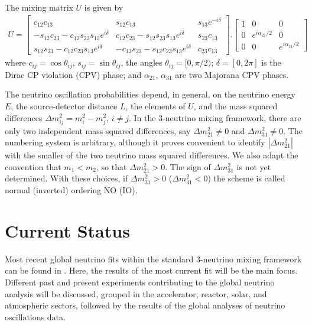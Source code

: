 \documentclass[english]{article}
\begin{document}
    The mixing matrix $U$ is given by
    \begin{gather}
    	U =
        	\begin{bmatrix}
            	c_{12}c_{13} & s_{12}c_{13} & s_{13}e^{-i\delta}\\
                -s_{12}c_{23}-c_{12}s_{23}s_{13}e^{i\delta} & c_{12}c_{23}-s_{12}s_{23}s_{13}e^{i\delta} & s_{23}c_{13}\\
                s_{12}s_{23}-c_{12}c_{23}s_{13}e^{i\delta} & -c_{12}s_{23}-s_{12}c_{23}s_{13}e^{i\delta} & c_{23}c_{13}
            \end{bmatrix} .
            \begin{bmatrix}
            	1 & 0 & 0\\
                0 & e^{i\alpha_{21}/2} & 0\\
                0 & 0 & e^{i\alpha_{31}/2}
            \end{bmatrix}
    \end{gather}
    where $c_{ij}=\cos\theta_{ij}$, $s_{ij}=\sin\theta_{ij}$, the angles $\theta_{ij}=[0,\pi/2)$; $\delta=[0,2\pi]$ is the Dirac CP violation (CPV) phase; and $\alpha_{21}$, $\alpha_{31}$ are two Majorana CPV phases.
    
    The neutrino oscillation probabilities depend, in general, on the neutrino
energy $E$, the source-detector distance $L$, the elements of $U$, and the mass squared differences $\Delta{m_{ij}^{2}}=m_i^{2}-m_j^{2}$, $i \neq j$. In the 3-neutrino mixing framework, there are only two independent mass squared differences, say $\Delta{m_{21}^{2}} \neq 0$ and $\Delta{m_{31}^{2}} \neq 0$. The numbering system is arbitrary, although it proves convenient to identify $|\Delta{m_{21}^{2}}|$ with the smaller of the two neutrino mass squared differences. We also adapt the convention that $m_{1}<m_{2}$, so that $\Delta{m_{21}^{2}}>0$. The sign of $\Delta{m_{31}^{2}}$ is not yet determined. With these choices, if $\Delta{m_{31}^{2}}>0$ ($\Delta{m_{31}^{2}}<0$) the scheme is called normal (inverted) ordering NO (IO).

\section{Current Status}
	Most recent global neutrino fits within the standard 3-neutrino mixing framework can be found in \cite{esteban2017} \cite{capozzi2017} \cite{salas2018}. Here, the results of the most current fit \cite{salas2018} will be the main focus. Different past and present experiments contributing to the global neutrino analysis will be discussed, grouped in the accelerator, reactor, solar, and atmospheric sectors, followed by the results of the global analyses of neutrino oscillations data.
\end{document}
